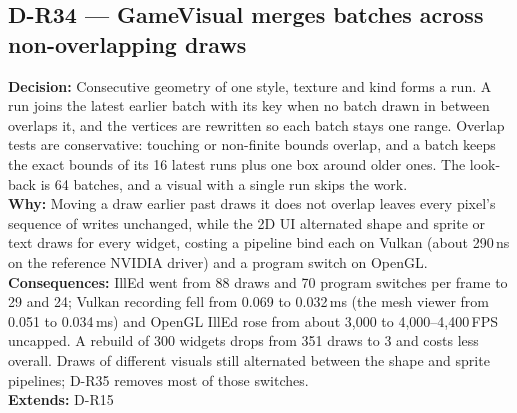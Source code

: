 \subsection*{D-R34 --- GameVisual merges batches across non-overlapping draws}
\begin{decisionbox}[title={D-R34 \quad 2026-10-01}]
\textbf{Decision:} Consecutive  geometry of one style,
texture and kind forms a run. A run joins the latest earlier batch with its
key when no batch drawn in between overlaps it, and the vertices are rewritten
so each batch stays one range. Overlap tests are conservative: touching or
non-finite bounds overlap, and a batch keeps the exact bounds of its 16 latest
runs plus one box around older ones. The look-back is 64 batches, and a visual
with a single run skips the work.\\
\textbf{Why:} Moving a draw earlier past draws it does not overlap leaves
every pixel's sequence of writes unchanged, while the 2D UI alternated shape
and sprite or text draws for every widget, costing a pipeline bind each on
Vulkan (about 290\,ns on the reference NVIDIA driver) and a program switch on
OpenGL.\\
\textbf{Consequences:} IllEd went from 88 draws and 70 program switches per
frame to 29 and 24; Vulkan recording fell from 0.069 to 0.032\,ms (the mesh
viewer from 0.051 to 0.034\,ms) and OpenGL IllEd rose from about 3,000 to
4,000--4,400\,FPS uncapped. A rebuild of 300 widgets drops from 351 draws to
3 and costs less overall. Draws of different visuals still alternated
between the shape and sprite pipelines; D-R35 removes most of those
switches.\\
\textbf{Extends:} D-R15
\end{decisionbox}

